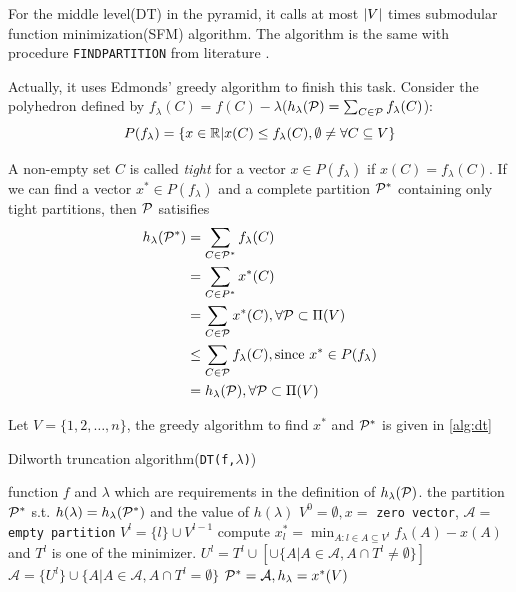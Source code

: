 \documentclass{article}
\begin{document}
For the middle level(DT) in the pyramid, it calls at most $\abs{V}$ times submodular function minimization(SFM) algorithm.
The algorithm is the same with procedure \texttt{FINDPARTITION} from literature \cite{mac}.

Actually, it uses Edmonds' greedy algorithm to finish this task. Consider the polyhedron defined by $f_{\lambda}(C) = f(C)-\lambda$($h_{\lambda}(\P)= \sum_{C \in \P} f_{\lambda}(C)$):
\begin{equation}
P(f_{\lambda}) = \{ x \in \R |  x(C) \leq f_{\lambda}(C), \emptyset \neq \forall C \subseteq V\}
\end{equation}

A non-empty set $C$ is called \textit{tight} for a vector $x \in P(f_{\lambda})$ if $x(C) = f_{\lambda}(C)$.
If we can find a vector $ x^* \in P(f_{\lambda}) $ and a complete partition $\P^*$ containing only tight partitions,
then $\P$ satisifies
\begin{align*}
h_{\lambda}(\P^*) &= \sum_{C \in \P^*} f_{\lambda}(C) \\
 &=\sum_{C\in P^*} x^*(C)  \\
& = \sum_{C \in \P} x^*(C), \forall \P \subset \Pi(V) \\
& \leq \sum_{C\in \P} f_{\lambda}(C), \textrm{since } x^* \in P(f_{\lambda}) \\
& = h_{\lambda}(\P),\forall \P \subset \Pi(V) 
\end{align*}

Let $V=\{1, 2, \dots, n\}$, the greedy algorithm to find $x^*$ and $\P^*$ is given in \ref{alg:dt}
\begin{algorithm}
\caption{Dilworth truncation algorithm(\texttt{DT(f,$\lambda$)})}\label{alg:dt}
\begin{algorithmic}[1]
\REQUIRE function $f$ and $\lambda$ which are requirements in the definition of $h_{\lambda}(\P)$.
\ENSURE the partition $\P^*$ s.t. $h(\lambda) = h_{\lambda}(\P^*)$ and the value of $h(\lambda)$
\STATE $V^0 = \emptyset, x = $ \texttt{zero vector}, $\mathcal{A} = $ \texttt{empty partition} 
\STATE $V^l = \{l\} \cup V^{l-1}$
\STATE\label{alg:tight} compute $x^*_l = \displaystyle\min_{ A: l \in A \subseteq V^l} f_{\lambda}(A)- x(A)$ and $T^l$ is one of the minimizer.
\STATE $U^l = T^l \cup [\cup \{A | A \in \mathcal{A}, A \cap T^l \neq \emptyset\}] $
\STATE $\mathcal{A} = \{U^l\} \cup \{A | A \in \mathcal{A}, A \cap T^l = \emptyset \}$
\ENDFOR
\STATE $\P^* = \mathcal{A}, h_{\lambda} = x^*(V)$
\end{algorithmic}
\end{algorithm}
\end{document}
